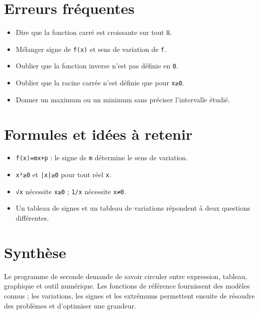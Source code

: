 \section{Erreurs fréquentes}

\begin{itemize}
\item Dire que la fonction carré est croissante sur tout \texttt{ℝ}.
\item Mélanger signe de \texttt{f(x)} et sens de variation de \texttt{f}.
\item Oublier que la fonction inverse n'est pas définie en \texttt{0}.
\item Oublier que la racine carrée n'est définie que pour \texttt{x≥0}.
\item Donner un maximum ou un minimum sans préciser l'intervalle étudié.
\end{itemize}

\section{Formules et idées à retenir}

\begin{itemize}
\item \texttt{f(x)=mx+p} : le signe de \texttt{m} détermine le sens de variation.
\item \texttt{x²≥0} et \texttt{|x|≥0} pour tout réel \texttt{x}.
\item \texttt{√x} nécessite \texttt{x≥0} ; \texttt{1/x} nécessite \texttt{x≠0}.
\item Un tableau de signes et un tableau de variations répondent à deux questions différentes.
\end{itemize}

\section{Synthèse}

Le programme de seconde demande de savoir circuler entre expression, tableau, graphique et outil numérique. Les fonctions de référence fournissent des modèles connus ; les variations, les signes et les extrémums permettent ensuite de résoudre des problèmes et d'optimiser une grandeur.
